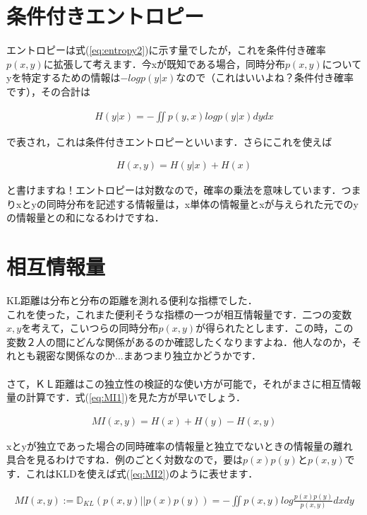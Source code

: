 \documentclass[11pt,a4paper,uplatex]{ujreport}
\begin{document}
\section{条件付きエントロピー}
エントロピーは式(\ref{eq:entropy2})に示す量でしたが，これを条件付き確率$p(x,y)$に拡張して考えます．今xが既知である場合，同時分布$p(x,y)$についてyを特定するための情報は$-log p(y|x)$なので（これはいいよね？条件付き確率です），その合計は

\begin{eqnarray}
\label{eq:cond_entropy1}
H(y|x) = - \iint p(y,x) log p(y|x) dy dx
\end{eqnarray}

で表され，これは条件付きエントロピーといいます\cite{prml}\cite{dist}．さらにこれを使えば

\begin{eqnarray}
\label{eq:cond_entropy2}
H(x,y) = H(y|x) + H(x)
\end{eqnarray}

と書けますね！エントロピーは対数なので，確率の乗法を意味しています．つまりxとyの同時分布を記述する情報量は，x単体の情報量とxが与えられた元でのyの情報量との和になるわけですね．

\section{相互情報量}
KL距離は分布と分布の距離を測れる便利な指標でした．\\
これを使った，これまた便利そうな指標の一つが相互情報量です．二つの変数$x, y$を考えて，こいつらの同時分布$p(x,y)$が得られたとします．この時，この変数２人の間にどんな関係があるのか確認したくなりますよね．他人なのか，それとも親密な関係なのか...まあつまり独立かどうかです．\\
\\
さて，ＫＬ距離はこの独立性の検証的な使い方が可能で，それがまさに相互情報量の計算です．式(\ref{eq:MI1})を見た方が早いでしょう\cite{dist}．

\begin{eqnarray}
\label{eq:MI1}
MI(x,y) = H(x) + H(y) - H(x,y)
\end{eqnarray}

xとyが独立であった場合の同時確率の情報量と独立でないときの情報量の離れ具合を見るわけですね．例のごとく対数なので，要は$p(x)p(y)とp(x,y)$です．これはKLDを使えば式(\ref{eq:MI2})のように表せます．

\begin{eqnarray}
\label{eq:MI2}
  MI(x,y) := \mathbb{D}_{KL}(p(x,y) || p(x)p(y)) = -\iint p(x,y) log \frac{p(x)p(y)}{p(x,y)} dxdy
\end{eqnarray}
\end{document}
